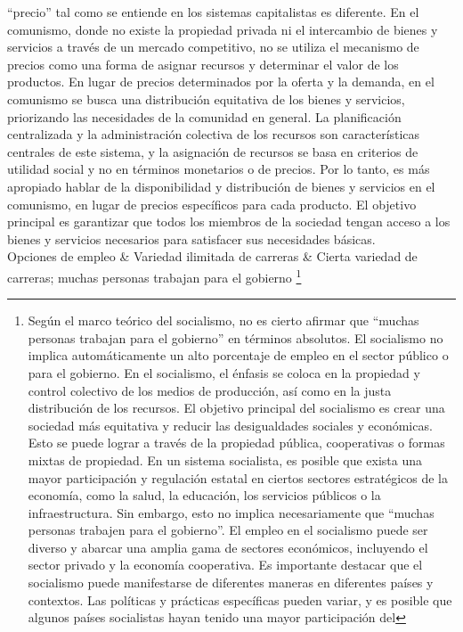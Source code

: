 \documentclass[
  letterpaper,
  DIV=11,
  numbers=noendperiod]{scrartcl}
\begin{document}
\begin{longtable}[]
{  ``precio'' tal como se entiende en los sistemas capitalistas es
  diferente. En el comunismo, donde no existe la propiedad privada ni el
  intercambio de bienes y servicios a través de un mercado competitivo,
  no se utiliza el mecanismo de precios como una forma de asignar
  recursos y determinar el valor de los productos. En lugar de precios
  determinados por la oferta y la demanda, en el comunismo se busca una
  distribución equitativa de los bienes y servicios, priorizando las
  necesidades de la comunidad en general. La planificación centralizada
  y la administración colectiva de los recursos son características
  centrales de este sistema, y la asignación de recursos se basa en
  criterios de utilidad social y no en términos monetarios o de precios.
  Por lo tanto, es más apropiado hablar de la disponibilidad y
  distribución de bienes y servicios en el comunismo, en lugar de
  precios específicos para cada producto. El objetivo principal es
  garantizar que todos los miembros de la sociedad tengan acceso a los
  bienes y servicios necesarios para satisfacer sus necesidades básicas.} \\
Opciones de empleo & Variedad ilimitada de carreras & Cierta variedad de
carreras; muchas personas trabajan para el gobierno \footnote{Según el
  marco teórico del socialismo, no es cierto afirmar que ``muchas
  personas trabajan para el gobierno'' en términos absolutos. El
  socialismo no implica automáticamente un alto porcentaje de empleo en
  el sector público o para el gobierno. En el socialismo, el énfasis se
  coloca en la propiedad y control colectivo de los medios de
  producción, así como en la justa distribución de los recursos. El
  objetivo principal del socialismo es crear una sociedad más equitativa
  y reducir las desigualdades sociales y económicas. Esto se puede
  lograr a través de la propiedad pública, cooperativas o formas mixtas
  de propiedad. En un sistema socialista, es posible que exista una
  mayor participación y regulación estatal en ciertos sectores
  estratégicos de la economía, como la salud, la educación, los
  servicios públicos o la infraestructura. Sin embargo, esto no implica
  necesariamente que ``muchas personas trabajen para el gobierno''. El
  empleo en el socialismo puede ser diverso y abarcar una amplia gama de
  sectores económicos, incluyendo el sector privado y la economía
  cooperativa. Es importante destacar que el socialismo puede
  manifestarse de diferentes maneras en diferentes países y contextos.
  Las políticas y prácticas específicas pueden variar, y es posible que
  algunos países socialistas hayan tenido una mayor participación del
}
\end{longtable}
\end{document}
